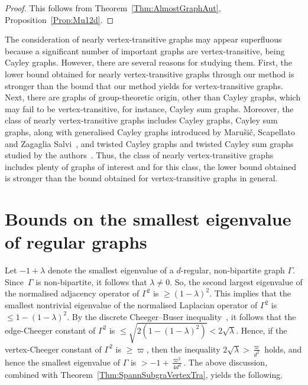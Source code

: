 \documentclass[ALCO,Unicode,published]{cedram}
\begin{document}
\begin{proof}
This follows from Theorem~\ref{Thm:AlmostGraphAut}, Proposition~\ref{Prop:Mu12d}. 
\end{proof}

\begin{remark}
\label{Rk:NearlyVertexTra}
The consideration of nearly vertex-transitive graphs may appear superfluous because a significant number of important graphs are vertex-transitive, being Cayley graphs. However, there are several reasons for studying them. First, the lower bound obtained for nearly vertex-transitive graphs through our method is stronger than the bound that our method yields for vertex-transitive graphs. Next, there are graphs of group-theoretic origin, other than Cayley graphs, which may fail to be vertex-transitive, for instance, Cayley sum graphs. Moreover, the class of nearly vertex-transitive graphs includes Cayley graphs, Cayley sum graphs, along with generalised Cayley graphs introduced by Maru\v{s}i\v{c}, Scapellato and Zagaglia Salvi~\cite{MarusicScapellatoZagagliaSalviGeneralizedCayleyGraph}, and twisted Cayley graphs and twisted Cayley sum graphs studied by the authors~\cite{CheegerTwisted}. Thus, the class of nearly vertex-transitive graphs includes plenty of graphs of interest and for this class, the lower bound obtained is stronger than the bound obtained for vertex-transitive graphs in general. 
\end{remark}

\section{Bounds on the smallest eigenvalue of regular graphs} 

Let $-1+\lambda$ denote the smallest eigenvalue of a $d$-regular, non-bipartite graph $\Gamma$. Since~$\Gamma$ is non-bipartite, it follows that $\lambda \neq 0$. So, the second largest eigenvalue of the normalised adjacency operator of $\Gamma^2$ is $\geq (1- \lambda)^2$. This implies that the smallest nontrivial eigenvalue of the normalised Laplacian operator of $\Gamma^2$ is $\leq 1 - (1-\lambda)^2$. By the discrete Cheeger--Buser inequality~\cite[Theorem 2.2]{ChungSpectralGraphTheory}, it follows that the edge-Cheeger constant of $\Gamma^2$ is $\leq \sqrt {2 (1 - (1-\lambda)^2)} < 2\sqrt \lambda$. Hence, if the vertex-Cheeger constant of $\Gamma^2$ is $\geq \varpi$, then the inequality $2 \sqrt \lambda > \frac{\varpi}{d^2}$ holds, and hence the smallest eigenvalue of $\Gamma$ is $> -1 + \frac {\varpi^2}{4d^4}$. 
The above discussion, combined with Theorem~\ref{Thm:SpannSubgraVertexTra}, yields the following. 
\end{document}
